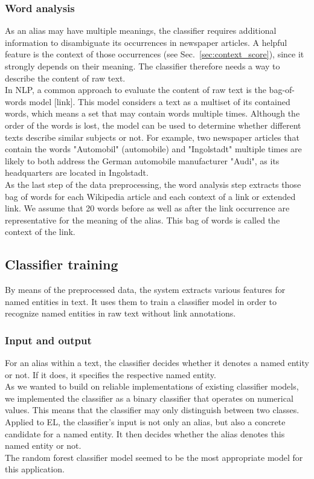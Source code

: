 \subsubsection{Word analysis}
As an alias may have multiple meanings, the classifier requires additional information to disambiguate its occurrences in newspaper articles. A helpful feature is the context of those occurrences (see Sec.~\ref{sec:context_score}), since it strongly depends on their meaning. The classifier therefore needs a way to describe the content of raw text.\\
In NLP, a common approach to evaluate the content of raw text is the bag-of-words model [link]. This model considers a text as a multiset of its contained words, which means a set that may contain words multiple times. Although the order of the words is lost, the model can be used to determine whether different texts describe similar subjects or not. For example, two newspaper articles that contain the words "Automobil" (automobile) and "Ingolstadt" multiple times are likely to both address the German automobile manufacturer "Audi", as its headquarters are located in Ingolstadt.\\
As the last step of the data preprocessing, the word analysis step extracts those bag of words for each Wikipedia article and each context of a link or extended link. We assume that 20 words before as well as after the link occurrence are representative for the meaning of the alias. This bag of words is called the context of the link.\\

\subsection{Classifier training}
By means of the preprocessed data, the system extracts various features for named entities in text. It uses them to train a classifier model in order to recognize named entities in raw text without link annotations.\\

\subsubsection{Input and output}
For an alias within a text, the classifier decides whether it denotes a named entity or not. If it does, it specifies the respective named entity.\\
As we wanted to build on reliable implementations of existing classifier models, we implemented the classifier as a binary classifier that operates on numerical values. This means that the classifier may only distinguish between two classes. Applied to EL, the classifier's input is not only an alias, but also a concrete candidate for a named entity. It then decides whether the alias denotes this named entity or not.\\
The random forest classifier model seemed to be the most appropriate model for this application.\\

